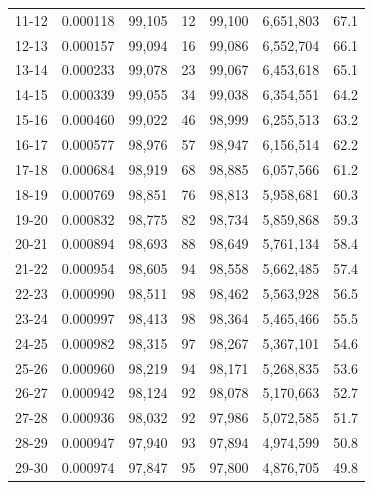 \documentclass[12pt,a4paper]{article}
\begin{document}
\begin{longtable}{|c|c|c|c|c|c|c|}
11-12  & 0.000118      & 99,105       & 12            & 99,100        & 6,651,803    & 67.1         \\
12-13  & 0.000157      & 99,094       & 16            & 99,086        & 6,552,704    & 66.1         \\
13-14  & 0.000233      & 99,078       & 23            & 99,067        & 6,453,618    & 65.1         \\
14-15  & 0.000339      & 99,055       & 34            & 99,038        & 6,354,551    & 64.2         \\
15-16  & 0.000460      & 99,022       & 46            & 98,999        & 6,255,513    & 63.2         \\
16-17  & 0.000577      & 98,976       & 57            & 98,947        & 6,156,514    & 62.2         \\
17-18  & 0.000684      & 98,919       & 68            & 98,885        & 6,057,566    & 61.2         \\
18-19  & 0.000769      & 98,851       & 76            & 98,813        & 5,958,681    & 60.3         \\
19-20  & 0.000832      & 98,775       & 82            & 98,734        & 5,859,868    & 59.3         \\
20-21  & 0.000894      & 98,693       & 88            & 98,649        & 5,761,134    & 58.4         \\
21-22  & 0.000954      & 98,605       & 94            & 98,558        & 5,662,485    & 57.4         \\
22-23  & 0.000990      & 98,511       & 98            & 98,462        & 5,563,928    & 56.5         \\
23-24  & 0.000997      & 98,413       & 98            & 98,364        & 5,465,466    & 55.5         \\
24-25  & 0.000982      & 98,315       & 97            & 98,267        & 5,367,101    & 54.6         \\
25-26  & 0.000960      & 98,219       & 94            & 98,171        & 5,268,835    & 53.6         \\
26-27  & 0.000942      & 98,124       & 92            & 98,078        & 5,170,663    & 52.7         \\
27-28  & 0.000936      & 98,032       & 92            & 97,986        & 5,072,585    & 51.7         \\
28-29  & 0.000947      & 97,940       & 93            & 97,894        & 4,974,599    & 50.8         \\
29-30  & 0.000974      & 97,847       & 95            & 97,800        & 4,876,705    & 49.8         \\

\end{longtable}
\end{document}
